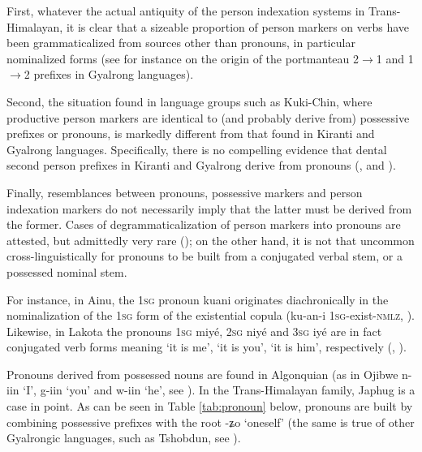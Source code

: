 \documentclass[oldfontcommands,oneside,a4paper,11pt]{article}
\newcommand{\ipa}[1]{{\phon \mbox{#1}}} %
\begin{document}
First, whatever the actual antiquity of the person indexation systems in Trans-Himalayan, it is clear that a sizeable proportion of person markers on verbs have been grammaticalized from sources other than pronouns, in particular nominalized forms (see for instance \citealt{jacques15generic} on the origin of the portmanteau 2$\rightarrow$1 and 1$\rightarrow$2 prefixes in Gyalrong languages).

Second, the situation found in language groups such as Kuki-Chin, where productive person markers are identical to (and probably derive from) possessive prefixes or pronouns, is markedly different from that found in Kiranti and Gyalrong languages. Specifically, there is no compelling evidence that dental second person prefixes in Kiranti and Gyalrong derive from pronouns (\citealt{jacques12agreement}, \citealt{delancey10agreement, delancey11prefixes} and \citeyear{delancey14second}).

Finally, resemblances between pronouns, possessive markers and person indexation markers do not necessarily imply that the latter must be derived from the former. Cases of degrammaticalization of person markers into pronouns are attested, but admittedly very rare (\citealt{norde09degrammaticalization, hyman11macrosudan}); on the other hand, it is not that uncommon cross-linguistically for pronouns to be built from a conjugated verbal stem, or a possessed nominal stem. 

For instance, in Ainu, the \textsc{1sg} pronoun \ipa{kuani} originates diachronically in the nominalization of the \textsc{1sg} form of the existential copula (\ipa{ku-an-i} \textsc{1sg}-exist-\textsc{nmlz}, \citealt[31]{shibatani90japan}). Likewise, in Lakota the pronouns \textsc{1sg} \ipa{miyé}, \textsc{2sg} \ipa{niyé} and \textsc{3sg} \ipa{iyé} are in fact conjugated verb forms meaning `it is me', `it is you', `it is him', respectively (\citealt{deloria41}, \citealt[707;754]{ullrich08}). 

Pronouns derived from possessed nouns are found in Algonquian (as in Ojibwe \ipa{n-iin} `I', \ipa{g-iin} `you' and \ipa{w-iin} `he', see \citealt{valentine01grammar}). In the Trans-Himalayan family, Japhug is a case in point. As can be seen in Table \ref{tab:pronoun} below, pronouns are built by combining possessive prefixes with the root \ipa{-ʑo} `oneself' (the same is true of other Gyalrongic languages, such as Tshobdun, see \citealt[113]{jackson98morphology}).
\end{document}
